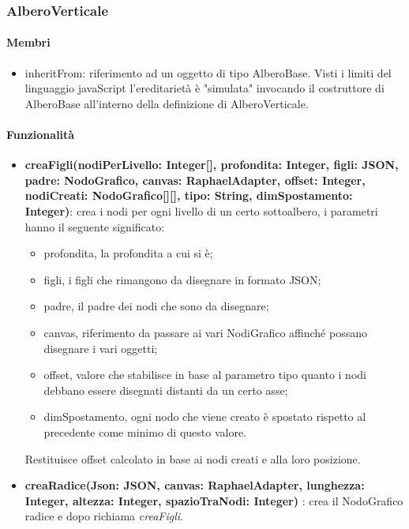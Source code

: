 \subsubsection{AlberoVerticale}
\paragraph{Membri}
\begin{itemize}
\item inheritFrom: riferimento ad un oggetto di tipo AlberoBase. Visti i limiti del linguaggio javaScript l'ereditarietà è "simulata" invocando il costruttore di AlberoBase all'interno della definizione di AlberoVerticale.
\end{itemize}
\paragraph{Funzionalità}
\begin{itemize}
\item \textbf{creaFigli(nodiPerLivello: Integer[], profondita: Integer, figli: JSON, padre: NodoGrafico, canvas: RaphaelAdapter, offset: Integer, nodiCreati: NodoGrafico[][], tipo: String, dimSpostamento: Integer)}: crea i nodi per ogni livello di un certo sottoalbero, i parametri hanno il seguente significato:
\begin{itemize}
\item profondita, la profondita a cui si è;
\item figli, i figli che rimangono da disegnare in formato JSON;
\item padre, il padre dei nodi che sono da disegnare;
\item canvas, riferimento da passare ai vari NodiGrafico affinché possano disegnare i vari oggetti;
\item offset, valore che stabilisce in base al parametro tipo quanto i nodi debbano essere disegnati distanti da un certo asse;
\item dimSpostamento, ogni nodo che viene creato è spostato rispetto al precedente come minimo di questo valore.
\end{itemize}
Restituisce offset calcolato in base ai nodi creati e alla loro posizione.
\item \textbf{creaRadice(Json: JSON, canvas: RaphaelAdapter, lunghezza: Integer, altezza: Integer, spazioTraNodi: Integer)} : crea il NodoGrafico radice e dopo richiama \textit{creaFigli}.
\end{itemize}
